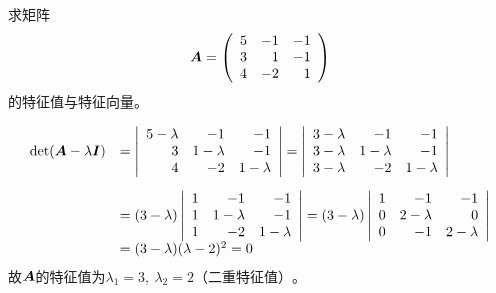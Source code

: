 \begin{frame}[fragile]
  \begin{li}
    求矩阵
    $$
    \boldsymbol{A}=\left(
      \begin{array}{rrr}
        5&-1&-1\\
        3&1&-1\\
        4&-2&1
      \end{array}
    \right)
    $$
    的特征值与特征向量。
  \end{li}
\end{frame}

\begin{frame}
  \begin{jie}
    $$
    \begin{array}{rl}
      \mathrm{det}(\boldsymbol{A}-\lambda\boldsymbol{I})
      &=\left|
        \begin{array}{rrr}
          5-\lambda&-1&-1\\
          3&1-\lambda&-1\\
          4&-2&1-\lambda
        \end{array}
                \right| = \left|
                \begin{array}{rrr}
                  3-\lambda&-1&-1\\
                  3-\lambda&1-\lambda&-1\\
                  3-\lambda&-2&1-\lambda
                \end{array}
                                \right|\\[0.3in]
      &= (3-\lambda)\left|
        \begin{array}{rrr}
          1&-1&-1\\
          1&1-\lambda&-1\\
          1&-2&1-\lambda
        \end{array}
                \right|= (3-\lambda)\left|
                \begin{array}{rrr}
                  1&-1&-1\\
                  0&2-\lambda&0\\
                  0&-1&2-\lambda
                \end{array}
                        \right|\\
      &=(3-\lambda)(\lambda-2)^2=0
    \end{array}
    $$
    故$\boldsymbol{A}$的特征值为$\lambda_1=3,~\lambda_2=2\mbox{（二重特征值）}$。


\end{jie}
\end{frame}
